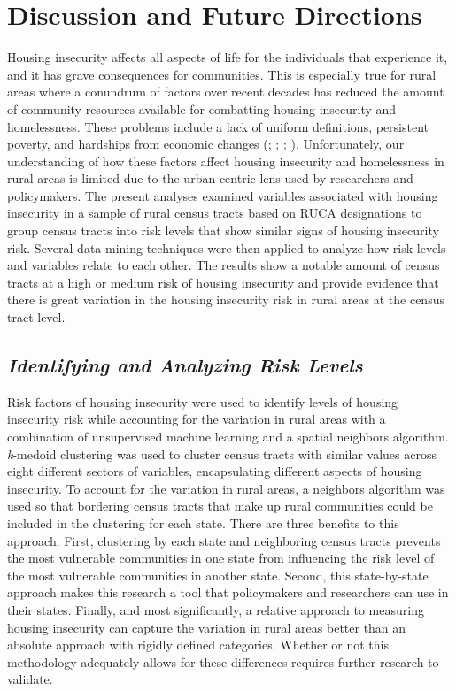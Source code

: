 \chapter{Discussion and Future Directions}	

Housing insecurity affects all aspects of life for the individuals that experience it, and it has grave consequences for communities. This is especially true for rural areas where a conundrum of factors over recent decades has reduced the amount of community resources available for combatting housing insecurity and homelessness. These problems include a lack of uniform definitions, persistent poverty, and hardships from economic changes (\citealp{yousey_defining_2018}; \citealp{crandall_local_2004}; \citealp{pendall_future_2016}; \citealp{kropczynski_insights_2012}). Unfortunately, our understanding of how these factors affect housing insecurity and homelessness in rural areas is limited due to the urban-centric lens used by researchers and policymakers. The present analyses examined variables associated with housing insecurity in a sample of rural census tracts based on RUCA designations to group census tracts into risk levels that show similar signs of housing insecurity risk. Several data mining techniques were then applied to analyze how risk levels and variables relate to each other. The results show a notable amount of census tracts at a high or medium risk of housing insecurity and provide evidence that there is great variation in the housing insecurity risk in rural areas at the census tract level. 

\section{\textit{Identifying and Analyzing Risk Levels}}

Risk factors of housing insecurity were used to identify levels of housing insecurity risk while accounting for the variation in rural areas with a combination of unsupervised machine learning and a spatial neighbors algorithm. \textit{k}-medoid clustering was used to cluster census tracts with similar values across eight different sectors of variables, encapsulating different aspects of housing insecurity. To account for the variation in rural areas, a neighbors algorithm was used so that bordering census tracts that make up rural communities could be included in the clustering for each state. There are three benefits to this approach. First, clustering by each state and neighboring census tracts prevents the most vulnerable communities in one state from influencing the risk level of the most vulnerable communities in another state. Second, this state-by-state approach makes this research a tool that policymakers and researchers can use in their states. Finally, and most significantly, a relative approach to measuring housing insecurity can capture the variation in rural areas better than an absolute approach with rigidly defined categories. Whether or not this methodology adequately allows for these differences requires further research to validate.

